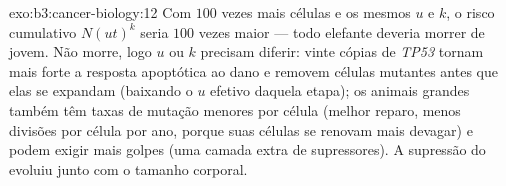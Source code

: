 \begin{solution}{exo:b3:cancer-biology:12}
Com $100$ vezes mais células e os mesmos $u$ e $k$, o risco cumulativo
$N(ut)^{k}$ seria $100$ vezes maior --- todo elefante deveria morrer de
 jovem. Não morre, logo $u$ ou $k$ precisam diferir: vinte cópias
de \emph{TP53} tornam mais forte a resposta apoptótica ao dano e
removem células mutantes antes que elas se expandam (baixando o $u$
efetivo daquela etapa); os animais grandes também têm taxas de mutação
menores por célula (melhor reparo, menos divisões por célula por ano,
porque suas células se renovam mais devagar) e podem exigir mais golpes
(uma camada extra de supressores). A supressão do  evoluiu junto
com o tamanho corporal.
\end{solution}

